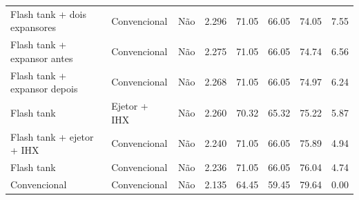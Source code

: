 {\begin{tabular}{llcrrrrr}
Flash tank + dois expansores & Convencional & Não & 2.296 & 71.05 & 66.05 & 74.05 & 7.55 \\
Flash tank + expansor antes & Convencional & Não & 2.275 & 71.05 & 66.05 & 74.74 & 6.56 \\
Flash tank + expansor depois & Convencional & Não & 2.268 & 71.05 & 66.05 & 74.97 & 6.24 \\
Flash tank & Ejetor + IHX & Não & 2.260 & 70.32 & 65.32 & 75.22 & 5.87 \\
Flash tank + ejetor + IHX & Convencional & Não & 2.240 & 71.05 & 66.05 & 75.89 & 4.94 \\
Flash tank & Convencional & Não & 2.236 & 71.05 & 66.05 & 76.04 & 4.74 \\
Convencional & Convencional & Não & 2.135 & 64.45 & 59.45 & 79.64 & 0.00 \\
\bottomrule
\end{tabular}
}
